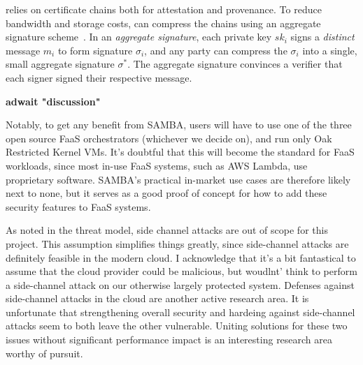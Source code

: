 %
\SystemName relies on certificate chains both for attestation and provenance.
%
To reduce bandwidth and storage costs, \SystemName can compress the chains
using an aggregate signature
scheme~\cite{03-eurocrypt-aggregate_signatures_bilinear_maps}.
%
In an \emph{aggregate signature},
each private key $sk_i$ signs a \emph{distinct} message $m_i$ to form signature
$\sigma_i$, and any party can compress the $\sigma_i$ into a single,
small aggregate signature $\sigma^*$.  
%
The aggregate signature convinces a verifier that each signer signed their
respective message.

\textbf{adwait "discussion"}

Notably, to get any benefit from SAMBA, users will have to use one of the three open source FaaS orchestrators (whichever we decide on), and run only Oak Restricted Kernel VMs.
It's doubtful that this will become the standard for FaaS workloads, since most in-use FaaS systems, such as AWS Lambda, use proprietary software.
SAMBA's practical in-market use cases are therefore likely next to none, but it serves as a good proof of concept for how to add these security features to FaaS systems.

As noted in the threat model, side channel attacks are out of scope for this project.
This assumption simplifies things greatly, since side-channel attacks are definitely feasible in the modern cloud. \cite{zhao_everywhere_2024} \cite{zhao_last-level_2024}
I acknowledge that it's a bit fantastical to assume that the cloud provider could be malicious, but woudlnt' think to perform a side-channel attack on our otherwise largely protected system.
Defenses against side-channel attacks in the cloud are another active research area.
It is unfortunate that strengthening overall security and hardeing against side-channel attacks seem to both leave the other vulnerable.
Uniting solutions for these two issues without significant performance impact is an interesting research area worthy of pursuit.
